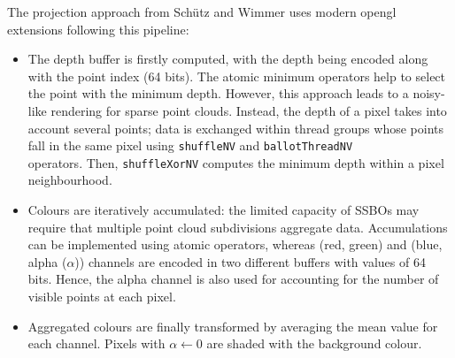 \begin{kaobox}[frametitle=Compute shader logic proposed by Schütz and Wimmer]
The projection approach from Schütz and Wimmer \cite{schutz_rendering_2021} uses modern \acrshort{opengl} extensions following this pipeline:
\begin{itemize}
    \item The depth buffer is firstly computed, with the depth being encoded along with the point index (64 bits). The atomic minimum operators help to select the point with the minimum depth. However, this approach leads to a noisy-like rendering for sparse point clouds. Instead, the depth of a pixel takes into account several points; data is exchanged within thread groups whose points fall in the same pixel using \footnotesize\verb|shuffleNV|\normalsize \hspace{.1mm} and \hspace{.1mm} \footnotesize\verb|ballotThreadNV|\normalsize\\ \hspace{.1mm} operators. Then, \footnotesize\verb|shuffleXorNV|\normalsize \hspace{.1mm} computes the minimum depth within a pixel neighbourhood.
    \item Colours are iteratively accumulated: the limited capacity of SSBOs may require that multiple point cloud subdivisions aggregate data. Accumulations can be implemented using atomic operators, whereas (red, green) and (blue, alpha ($\alpha$)) channels are encoded in two different buffers with values of 64 bits. Hence, the alpha channel is also used for accounting for the number of visible points at each pixel.
    \item Aggregated colours are finally transformed by averaging the mean value for each channel. Pixels with $\alpha \gets 0$ are shaded with the background colour. 
\end{itemize}
\end{kaobox}

